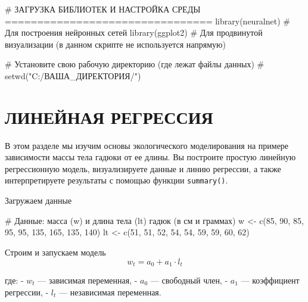 \documentclass[
  letterpaper,
  DIV=11,
  numbers=noendperiod]{scrreprt}
\newenvironment{Shaded}{\begin{snugshade}}{\end{snugshade}}
\newcommand{\CommentTok}[1]{\textcolor[rgb]{0.37,0.37,0.37}{#1}}
\newcommand{\DecValTok}[1]{\textcolor[rgb]{0.68,0.00,0.00}{#1}}
\newcommand{\FunctionTok}[1]{\textcolor[rgb]{0.28,0.35,0.67}{#1}}
\newcommand{\NormalTok}[1]{\textcolor[rgb]{0.00,0.23,0.31}{#1}}
\newcommand{\OtherTok}[1]{\textcolor[rgb]{0.00,0.23,0.31}{#1}}
\begin{document}
\begin{Shaded}
\begin{Highlighting}[]
\CommentTok{\# ЗАГРУЗКА БИБЛИОТЕК И НАСТРОЙКА СРЕДЫ ================================}
\FunctionTok{library}\NormalTok{(neuralnet)   }\CommentTok{\# Для построения нейронных сетей}
\FunctionTok{library}\NormalTok{(ggplot2)     }\CommentTok{\# Для продвинутой визуализации (в данном скрипте не используется напрямую)}

\CommentTok{\# Установите свою рабочую директорию (где лежат файлы данных)}
\CommentTok{\# setwd("C:/ВАША\_ДИРЕКТОРИЯ/")}
\end{Highlighting}
\end{Shaded}

\section{ЛИНЕЙНАЯ
РЕГРЕССИЯ}\label{ux43bux438ux43dux435ux439ux43dux430ux44f-ux440ux435ux433ux440ux435ux441ux441ux438ux44f}

В этом разделе мы изучим основы экологического моделирования на примере
зависимости массы тела гадюки от ее длины. Вы построите простую линейную
регрессионную модель, визуализируете данные и линию регрессии, а также
интерпретируете результаты с помощью функции \texttt{summary()}.

Загружаем данные

\begin{Shaded}
\begin{Highlighting}[]
\CommentTok{\# Данные: масса (w) и длина тела (lt) гадюк (в см и граммах)}
\NormalTok{w }\OtherTok{\textless{}{-}} \FunctionTok{c}\NormalTok{(}\DecValTok{85}\NormalTok{, }\DecValTok{90}\NormalTok{, }\DecValTok{85}\NormalTok{, }\DecValTok{95}\NormalTok{, }\DecValTok{95}\NormalTok{, }\DecValTok{135}\NormalTok{, }\DecValTok{165}\NormalTok{, }\DecValTok{135}\NormalTok{, }\DecValTok{140}\NormalTok{)}
\NormalTok{lt }\OtherTok{\textless{}{-}} \FunctionTok{c}\NormalTok{(}\DecValTok{51}\NormalTok{, }\DecValTok{51}\NormalTok{, }\DecValTok{52}\NormalTok{, }\DecValTok{54}\NormalTok{, }\DecValTok{54}\NormalTok{, }\DecValTok{59}\NormalTok{, }\DecValTok{59}\NormalTok{, }\DecValTok{60}\NormalTok{, }\DecValTok{62}\NormalTok{)}
\end{Highlighting}
\end{Shaded}

Строим и запускаем модель \[
w_t = a_0 + a_1 \cdot l_t
\]

где: - \(w_t\) --- зависимая переменная, - \(a_0\) --- свободный член, -
\(a_1\) --- коэффициент регрессии, - \(l_t\) --- независимая переменная.
\end{document}
